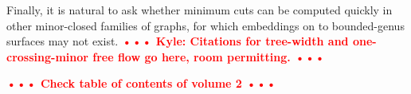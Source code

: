 \documentclass[natbib]{svcyclop}
\def\NOTE#1{\textcolor{Red}{\textbf{\textsf{••• #1 •••}}}}
\begin{document}
Finally, it is natural to ask whether minimum cuts can be computed quickly in other minor-closed families of graphs, for which embeddings on to bounded-genus surfaces may not exist.
\NOTE{Kyle: Citations for tree-width and one-crossing-minor free flow go here, room permitting.}



\CrossRef

\NOTE{Check table of contents of volume 2}


\nocite{bk-amfdp-09, hkrs-fspap-97, k-msspp-05, r-mstcp-83, insw-iamcmf-11, multishort, parshort, splitting, gohog, optcycles, surflow, surfcut, homcover, global, e-dgteg-03, c-scgsp-10, p-deeoc-13}


%

\end{document}
